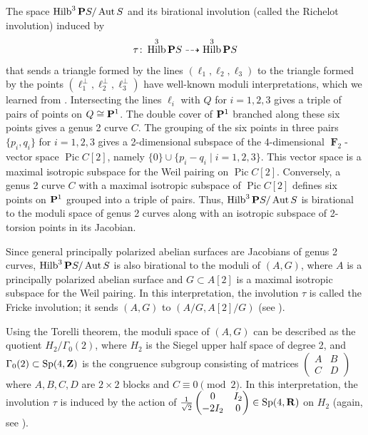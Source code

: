 \documentclass{amsart}
\providecommand {\Z}{{\bf Z}}
\providecommand {\R}{{\bf R}}
\renewcommand {\P}{{\bf P}}
\providecommand {\from}{{\colon}}
\providecommand{\Aut}{\operatorname{Aut}}
\providecommand{\Pic}{\operatorname{Pic}}
\numberwithin{equation}{section}
\DeclareMathOperator{\Hilb}{Hilb}
\DeclareMathOperator{\F}{\mathbf F}
\begin{document}
\begin{remark}
  \label{rem:richelot}
  The space $\Hilb^3 \P S / \Aut S$ and its birational involution (called the Richelot involution) induced by
  \begin{equation}\label{eqn:richelot}
    \tau \from \Hilb^3 \P S \dashrightarrow \Hilb^3 \P S
  \end{equation}
  that sends a triangle formed by the lines $(\ell_1, \ell_2, \ell_3)$ to the triangle formed by the points $(\ell_1^\perp, \ell_2^\perp, \ell_3^\perp)$ have well-known moduli interpretations, which we learned from \cite[Example~4.2]{dol.how:15}.
  Intersecting the lines $\ell_i$ with $Q$ for $i = 1, 2, 3$ gives a triple of pairs of points on $Q \cong \P^1$.
  The double cover of $\P^1$ branched along these six points gives a genus 2 curve $C$.
  The grouping of the six points in three pairs $\{p_i, q_i\}$ for $i = 1, 2, 3$ gives a 2-dimensional subspace of the 4-dimensional $\F_2$-vector space $\Pic C [2]$, namely $\{0\} \cup \{p_i - q_i \mid i = 1,2,3\}$.
  This vector space is a maximal isotropic subspace for the Weil pairing on $\Pic C[2]$.
  Conversely, a genus 2 curve $C$ with a maximal isotropic subspace of $\Pic C[2]$ defines six points on $\P^1$ grouped into a triple of pairs.
  Thus, $\Hilb^3 \P S / \Aut S$ is birational to the moduli space of genus 2 curves along with an isotropic subspace of 2-torsion points in its Jacobian.

  Since general principally polarized abelian surfaces are Jacobians of genus 2 curves, $\Hilb^3 \P S / \Aut S$ is also birational to the moduli of $(A, G)$, where $A$ is a principally polarized abelian surface and $G \subset A[2]$ is a maximal isotropic subspace for the Weil pairing.
  In this interpretation, the involution $\tau$ is called the Fricke involution; it sends $(A, G)$ to $(A/G, A[2]/G)$ (see \cite[Page~2]{muk:12}).

  Using the Torelli theorem, the moduli space of $(A, G)$ can be described as the quotient $H_2/\Gamma_0(2)$, where $H_2$ is the Siegel upper half space of degree 2, and $\Gamma_0(2) \subset \operatorname{Sp}(4, \Z)$ is the congruence subgroup consisting of matrices $\begin{pmatrix} A & B \\ C & D \end{pmatrix}$ where $A, B, C, D$ are $2 \times 2$ blocks and $C \equiv 0 \pmod 2$.
  In this interpretation, the involution $\tau$ is induced by the action of $\frac{1}{\sqrt 2} \begin{pmatrix} 0 & I_2 \\ -2 I_2 & 0 \end{pmatrix} \in \operatorname{Sp}(4, \R)$ on $H_2$ (again, see \cite[Page~2]{muk:12}).


\end{remark}
\end{document}
